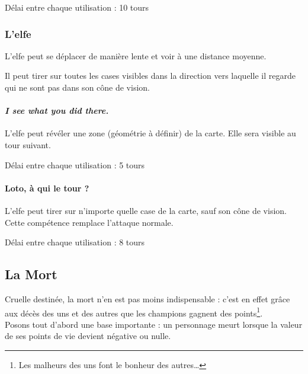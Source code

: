     Délai entre chaque utilisation : 10 tours

\subsubsection{L'elfe}


L'elfe peut se déplacer de manière lente et voir à une distance moyenne.

Il peut tirer sur toutes les cases visibles dans la direction vers laquelle il regarde qui ne sont pas dans son cône de vision.

\paragraph{\emph{I see what you did there.}} L'elfe peut révéler une zone (géométrie à définir) de la carte. Elle sera visible au tour suivant.

    Délai entre chaque utilisation : 5 tours

\paragraph{Loto, à qui le tour ?} L'elfe peut tirer sur n’importe quelle case de la carte, sauf son cône de vision. Cette compétence remplace l’attaque normale.

    Délai entre chaque utilisation : 8 tours

\subsection{La Mort}


Cruelle destinée, la mort n'en est pas moins indispensable : c'est en
effet grâce aux décès des uns et des autres que les champions gagnent
des points\footnote{Les malheurs des uns font le bonheur des autres\ldots{}}.\\

Posons tout d'abord une base importante : un personnage meurt lorsque
la valeur de ses points de vie devient négative ou nulle.

